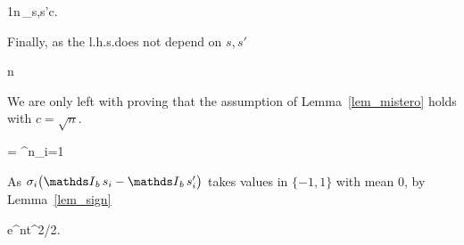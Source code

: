 \documentclass[scombinatorics.tex]{subfiles}
\begin{document}
\ceq{}
{\le}
{\frac1n\,\sup_{s,s'}c.}

Finally, as the l.h.s.\@ does not depend on $s,s'$

\ceq{}
{\le}
{n}

We are only left with proving that the assumption of Lemma~\ref{lem_mistero} holds with $c=\sqrt{n}$.

\ceq{\hfill\Ex\bigg[\exp\bigg(t\sum^n_{i=1} \sigma_i\big(\Indicator_b\,s_i -  \Indicator_b\,s'_i\big)\bigg)\bigg]}
{=}
{\prod^n_{i=1} \Ex{}}

As $\sigma_i\big(\Indicator_b\,s_i -  \Indicator_b\,s'_i\big)$ takes values in $\{-1,1\}$ with mean $0$, by Lemma~\ref{lem_sign}

\ceq{}
{\le}
{e^{nt^2/2}.}
\end{document}

